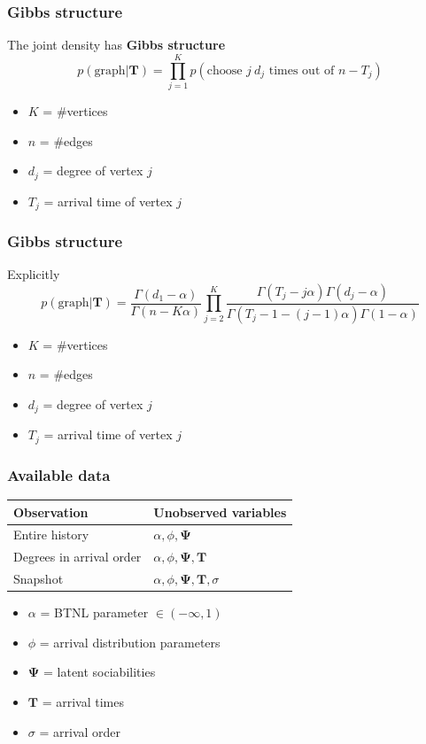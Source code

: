 \documentclass[final,hyperref={pdfpagelabels=false},noamsthm]{beamer}
\newcommand{\bfT}{\mathbf{T}}
\newcommand{\bfPsi}{\boldsymbol{\Psi}}
\begin{document}
\begin{frame}
	\frametitle{Gibbs structure}
	The joint density has \textbf{Gibbs structure}
	\begin{equation*}
	p(\text{graph}|\bfT) = \prod_{j=1}^K p(\text{choose }j\ d_j\text{ times out of } n - T_j)
	\end{equation*}
	\begin{itemize}
		\item $K$ = \#vertices
		\item $n$ = \#edges
		\item $d_j$ = degree of vertex $j$
		\item $T_j$ = arrival time of vertex $j$
	\end{itemize}
\end{frame}

\begin{frame}
	\frametitle{Gibbs structure}
	Explicitly
	\begin{equation*}
	p(\text{graph}|\bfT) = \frac{\Gamma(d_1 - \alpha)}{\Gamma(n - K\alpha)}\prod_{j=2}^K \frac{\Gamma(T_j - j\alpha)\Gamma(d_j - \alpha)}{\Gamma(T_j - 1 - (j-1)\alpha)\Gamma(1-\alpha)}
	\end{equation*}
	\begin{itemize}
		\item $K$ = \#vertices
		\item $n$ = \#edges
		\item $d_j$ = degree of vertex $j$
		\item $T_j$ = arrival time of vertex $j$
	\end{itemize}
\end{frame}

\begin{frame}
	\frametitle{Available data}
	\begin{center}
		\begin{tabular}{ll}
			\textbf{Observation} & \textbf{Unobserved variables} \\
			\hline
			Entire history & $\alpha,\phi,\bfPsi$ \\
			Degrees in arrival order & $\alpha,\phi,\bfPsi, \bfT$ \\
			Snapshot & $\alpha,\phi,\bfPsi,\bfT,\sigma$
		\end{tabular}
	\end{center}
	\begin{itemize}
		\item $\alpha$ = BTNL parameter $\in (-\infty, 1)$
		\item $\phi$ = arrival distribution parameters
		\item $\bfPsi$ = latent sociabilities
		\item $\bfT$ = arrival times
		\item $\sigma$ = arrival order
	\end{itemize}
\end{frame}
\end{document}
